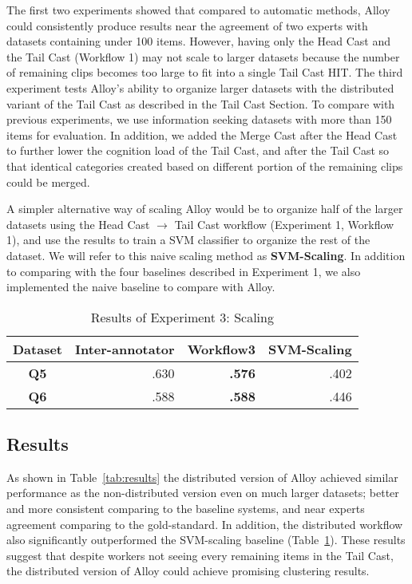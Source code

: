 

The first two experiments showed that compared to automatic methods, Alloy could consistently produce
results near the agreement of two experts with datasets containing under 100
items. However, having only the Head Cast and the Tail Cast (Workflow 1) may not
scale to larger datasets because the number of remaining
clips becomes too large to fit into a single Tail Cast HIT. 
The third experiment tests Alloy's ability to organize larger datasets with the distributed variant of 
the Tail Cast as described in the Tail Cast Section. To compare with previous experiments, we use information seeking datasets 
with more than 150 items for evaluation. In addition, we added the Merge Cast after the Head Cast to further
lower the cognition load of the Tail Cast, and after the Tail Cast so that identical categories created
based on different portion of the remaining clips could be merged.

A simpler alternative way of scaling Alloy would be to organize half of the
larger datasets using the Head Cast $\rightarrow$ Tail Cast workflow (Experiment 1, Workflow 1), and
use the results to train a SVM classifier to organize the rest of the dataset. We will refer
to this naive scaling method as \textbf{SVM-Scaling}.
In addition to comparing with the four baselines described in Experiment
1, we also implemented the naive baseline to compare with Alloy.

\begin{table}
  \centering
  \begin{tabular}{ c r r r}
    \hline
	Dataset &
	Inter-annotator &
	Workflow3 &
	SVM-Scaling \\
    \hline
	\textbf{Q5} & .630 & \textbf{.576} & .402 \\

	\textbf{Q6} & .588 & \textbf{.588} & .446 \\
    \hline
  \end{tabular}
  \caption{Results of Experiment 3: Scaling}
  \label{tab:scale_results}
\end{table}



\subsection{Results}

As shown in Table~\ref{tab:results} the distributed version of Alloy achieved similar
performance as the non-distributed version even on much larger datasets; better
and more consistent comparing to the baseline systems, and near experts
agreement comparing to the gold-standard. In addition, the distributed workflow
also significantly outperformed the SVM-scaling baseline
(Table~\ref{tab:scale_results}). These results suggest that despite workers not seeing every remaining items in the Tail Cast, the distributed version of Alloy could achieve promising clustering results.
